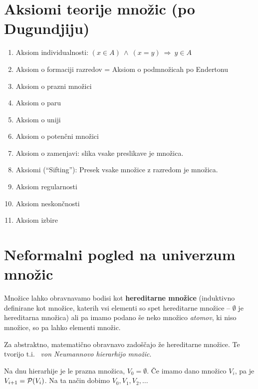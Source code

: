 \documentclass[11pt,paper=b5,DIV=13,headinclude,footinclude]{scrbook}
\def\inn {{~\wedge~}}
\def\sledi {{~\Rightarrow~}}
\begin{document}
\section{Aksiomi teorije množic (po Dugundjiju)}

\begin{enumerate}
  \item Aksiom individualnosti: $(x\in A) \inn (x = y) \sledi y\in A$
   
  \item Aksiom o formaciji razredov = Aksiom o podmnožicah po Endertonu
  
  \item Aksiom o prazni množici

\item Aksiom o paru

  \item Aksiom o uniji
  
  \item Aksiom o potenčni množici

  \item Aksiom o zamenjavi: slika vsake preslikave je množica.

  \item Aksiomi (``Sifting''): Presek vsake množice z razredom je množica.

\item Aksiom regularnosti

  \item Aksiom neskončnosti

\item Aksiom izbire
\end{enumerate}


\section{Neformalni pogled na univerzum množic}

Množice lahko obravnavamo  bodisi kot \textbf{ hereditarne množice} (induktivno definirane kot množice, katerih vsi elementi so
spet hereditarne množice -- $\emptyset$ je hereditarna množica)
ali pa imamo podano še neko množico \emph{ atomov}, ki niso množice, so pa lahko elementi množic.

Za abstraktno, matematično obravnavo zadoščajo že hereditarne množice.
Te tvorijo t.i.~\emph{ von Neumannovo hierarhijo množic}.

Na dnu hierarhije je le prazna množica, $V_0 = \emptyset$.
Če imamo dano množico $V_i$, pa je $V_{i+1} = {\cal P}(V_i)$.
Na ta način dobimo $V_0, V_1, V_2, \ldots$
\end{document}
